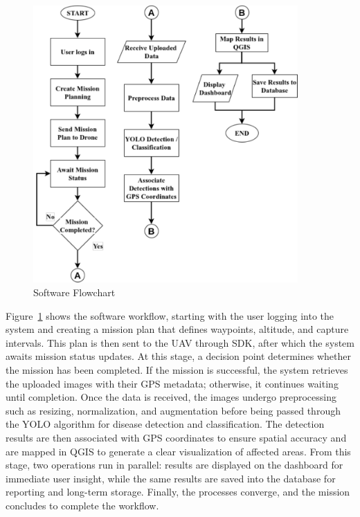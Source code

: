 \begin{figure}[H]
	\centering
	\caption{Software Flowchart}
	\label{fig:SoftFlow}
	\includegraphics[width=0.9\textwidth]{figures/software_flowchart.pdf}
\end{figure}

Figure~\ref{fig:SoftFlow} shows the software workflow, starting with the user logging into the system and creating a mission plan that defines waypoints, altitude, and capture intervals. This plan is then sent to the UAV through SDK, after which the system awaits mission status updates. At this stage, a decision point determines whether the mission has been completed. If the mission is successful, the system retrieves the uploaded images with their GPS metadata; otherwise, it continues waiting until completion. Once the data is received, the images undergo preprocessing such as resizing, normalization, and augmentation before being passed through the YOLO algorithm for disease detection and classification. The detection results are then associated with GPS coordinates to ensure spatial accuracy and are mapped in QGIS to generate a clear visualization of affected areas. From this stage, two operations run in parallel: results are displayed on the dashboard for immediate user insight, while the same results are saved into the database for reporting and long-term storage. Finally, the processes converge, and the mission concludes to complete the workflow.

